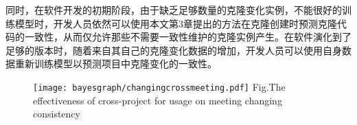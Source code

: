 同时，在软件开发的初期阶段，由于缺乏足够数量的克隆变化实例，不能很好的训练模型时，开发人员依然可以使用本文第3章提出的方法在克隆创建时预测克隆代码的一致性，从而仅允许那些不需要一致性维护的克隆实例产生。在软件演化到了足够的版本时，随着来自其自己的克隆变化数据的增加，开发人员可以使用自身数据重新训练模型以预测项目中克隆变化的一致性。

\begin{figure}[htbp]
\centering
\texttt{[image: bayesgraph/changingcrossmeeting.pdf]}
{Fig.$\!$}{The effectiveness of cross-project for usage on meeting changing consistency}
\vspace{-1em}
\end{figure}

